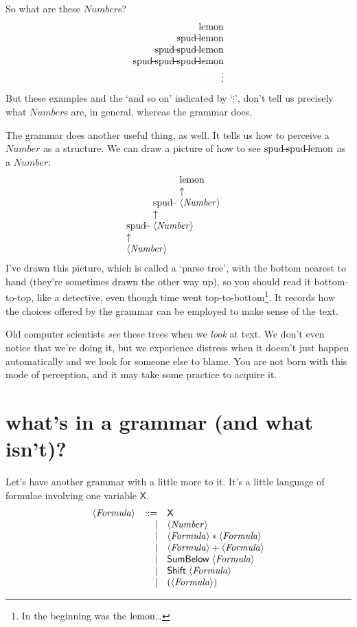 \documentclass{book}
\begin{document}
So what are these $\mathit{Number}$s?
\[\begin{array}{r}
\lemon \\
\spud\lemon \\
\spud\spud\lemon \\
\spud\spud\spud\lemon \\
\vdots
\end{array}\]
But these examples and the `and so on' indicated by `$\vdots$', don't tell us precisely what $\mathit{Number}$s are, in general, whereas the grammar does.

\newcommand{\nta}[2]{\begin{array}[b]{l} #2\\ \uparrow\\ \nt{#1}\end{array}}
The grammar does another useful thing, as well. It tells us how to perceive a $\mathit{Number}$ as a structure. We can draw a picture of how to see $\spud\spud\lemon$ as a $\mathit{Number}$:
\[\nta{Number}{\spud\nta{Number}{\spud\nta{Number}{\lemon}}}\]
I've drawn this picture, which is called a `parse tree', with the bottom nearest to hand (they're sometimes drawn the other way up), so you should read it bottom-to-top, like a detective, even though time went top-to-bottom\footnote{In the beginning was the $\mbox{lemon}$\ldots}. It records how the choices offered by the grammar can be employed to make sense of the text.

Old computer scientists \emph{see} these trees when we \emph{look} at text. We don't even notice that we're doing it, but we experience distress when it doesn't just happen automatically and we look for someone else to blame. You are not born with this mode of perception, and it may take some practice to acquire it.


\section{what's in a grammar (and what isn't)?}

\newcommand{\X}{\mathsf{X}}
\newcommand{\SB}{\mathsf{SumBelow}\;}
\newcommand{\SH}{\mathsf{Shift}\;}
Let's have another grammar with a little more to it. It's a little language of formulae involving one variable $\X$.
\[\begin{array}{rrl}
\nt{Formula}
& ::= & \X \\
&   | & \nt{Number} \\
&   | & \nt{Formula} * \nt{Formula} \\
&   | & \nt{Formula} + \nt{Formula} \\
&   | & \SB \nt{Formula} \\
&   | & \SH \nt{Formula} \\
&   | & (\nt{Formula})
\end{array}\]
\end{document}
